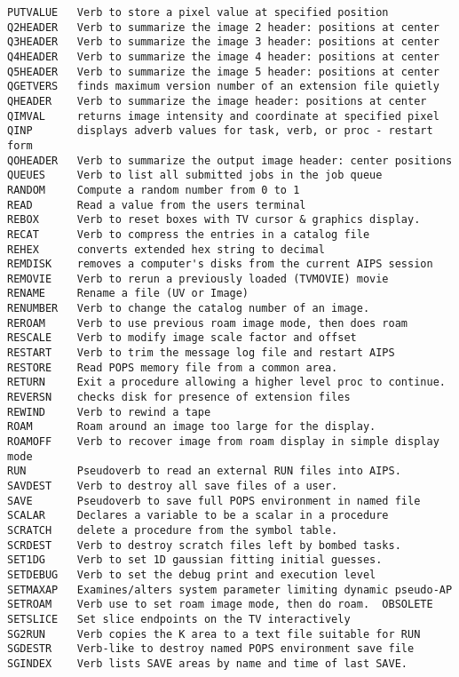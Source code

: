 \begin{verbatim}
PUTVALUE   Verb to store a pixel value at specified position
Q2HEADER   Verb to summarize the image 2 header: positions at center
Q3HEADER   Verb to summarize the image 3 header: positions at center
Q4HEADER   Verb to summarize the image 4 header: positions at center
Q5HEADER   Verb to summarize the image 5 header: positions at center
QGETVERS   finds maximum version number of an extension file quietly
QHEADER    Verb to summarize the image header: positions at center
QIMVAL     returns image intensity and coordinate at specified pixel
QINP       displays adverb values for task, verb, or proc - restart form
QOHEADER   Verb to summarize the output image header: center positions
QUEUES     Verb to list all submitted jobs in the job queue
RANDOM     Compute a random number from 0 to 1
READ       Read a value from the users terminal
REBOX      Verb to reset boxes with TV cursor & graphics display.
RECAT      Verb to compress the entries in a catalog file
REHEX      converts extended hex string to decimal
REMDISK    removes a computer's disks from the current AIPS session
REMOVIE    Verb to rerun a previously loaded (TVMOVIE) movie
RENAME     Rename a file (UV or Image)
RENUMBER   Verb to change the catalog number of an image.
REROAM     Verb to use previous roam image mode, then does roam
RESCALE    Verb to modify image scale factor and offset
RESTART    Verb to trim the message log file and restart AIPS
RESTORE    Read POPS memory file from a common area.
RETURN     Exit a procedure allowing a higher level proc to continue.
REVERSN    checks disk for presence of extension files
REWIND     Verb to rewind a tape
ROAM       Roam around an image too large for the display.
ROAMOFF    Verb to recover image from roam display in simple display mode
RUN        Pseudoverb to read an external RUN files into AIPS.
SAVDEST    Verb to destroy all save files of a user.
SAVE       Pseudoverb to save full POPS environment in named file
SCALAR     Declares a variable to be a scalar in a procedure
SCRATCH    delete a procedure from the symbol table.
SCRDEST    Verb to destroy scratch files left by bombed tasks.
SET1DG     Verb to set 1D gaussian fitting initial guesses.
SETDEBUG   Verb to set the debug print and execution level
SETMAXAP   Examines/alters system parameter limiting dynamic pseudo-AP
SETROAM    Verb use to set roam image mode, then do roam.  OBSOLETE
SETSLICE   Set slice endpoints on the TV interactively
SG2RUN     Verb copies the K area to a text file suitable for RUN
SGDESTR    Verb-like to destroy named POPS environment save file
SGINDEX    Verb lists SAVE areas by name and time of last SAVE.

\end{verbatim}
